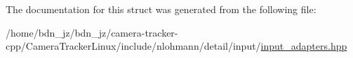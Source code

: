 The documentation for this struct was generated from the following file\+:\begin{DoxyCompactItemize}
\item 
/home/bdn\+\_\+jz/bdn\+\_\+jz/camera-\/tracker-\/cpp/\+Camera\+Tracker\+Linux/include/nlohmann/detail/input/\hyperlink{input__adapters_8hpp}{input\+\_\+adapters.\+hpp}\end{DoxyCompactItemize}
